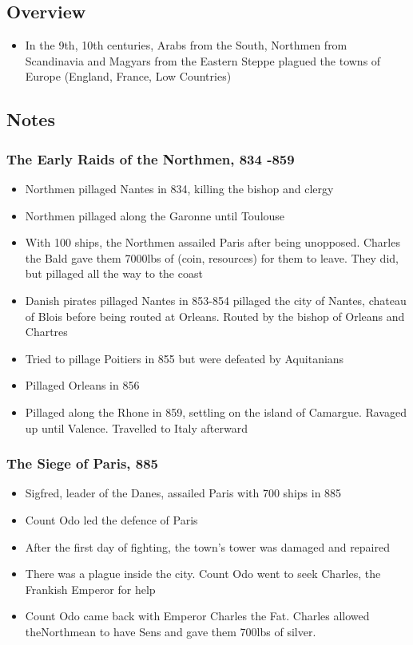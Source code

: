 \documentclass[12pt]{article}
\begin{document}
\subsection*{Overview}
\begin{itemize}
	\item In the 9th, 10th centuries, Arabs from the South, Northmen from Scandinavia and Magyars from the Eastern Steppe plagued the towns of Europe (England, France, Low Countries)
\end{itemize}

\subsection*{Notes}

\subsubsection*{The Early Raids of the Northmen, 834 -859}
\begin{itemize}
	\item Northmen pillaged Nantes in 834, killing the bishop and clergy
	\item Northmen pillaged along the Garonne until Toulouse
	\item With 100 ships, the Northmen assailed Paris after being unopposed. Charles the Bald gave them 7000lbs of (coin, resources) for them to leave. They did, but pillaged all the way to the coast
	\item Danish pirates pillaged Nantes in 853-854 pillaged the city of Nantes, chateau of Blois before being routed at Orleans. Routed by the bishop of Orleans and Chartres
	\item Tried to pillage Poitiers in 855 but were defeated by Aquitanians
	\item Pillaged Orleans in 856
	\item Pillaged along the Rhone in 859, settling on the island of Camargue. Ravaged up until Valence. Travelled to Italy afterward
\end{itemize}

\subsubsection*{The Siege of Paris, 885}
\begin{itemize}
	\item Sigfred, leader of the Danes, assailed Paris with 700 ships in 885
	\item Count Odo led the defence of Paris
	\item After the first day of fighting, the town's tower was damaged and repaired
	\item There was a plague inside the city. Count Odo went to seek Charles, the Frankish Emperor for help
	\item Count Odo came back with Emperor Charles the Fat. Charles allowed theNorthmean to have Sens and gave them 700lbs of silver.
\end{itemize}
	
\end{document}
